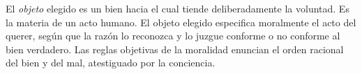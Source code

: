 	 El \emph{objeto} elegido es un bien hacia el cual tiende deliberadamente la voluntad. Es la materia de un acto humano. El objeto elegido especifica moralmente el acto del querer, según que la razón lo reconozca y lo juzgue conforme o no conforme al bien verdadero. Las reglas objetivas de la moralidad enuncian el orden racional del bien y del mal, atestiguado por la conciencia.
